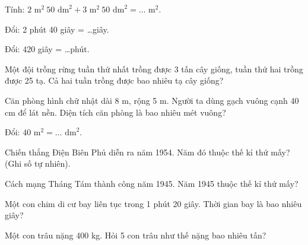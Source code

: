 \begin{ex}
Tính: $2\text{ m}^2\ 50\text{ dm}^2 + 3\text{ m}^2\ 50\text{ dm}^2 = \dots\text{ m}^2$.
\end{ex}

\begin{ex}
Đổi: 2 phút 40 giây = \dots giây.
\end{ex}

\begin{ex}
Đổi: 420 giây = \dots phút.
\end{ex}

\begin{ex}
Một đội trồng rừng tuần thứ nhất trồng được 3 tấn cây giống, tuần thứ hai trồng được 25 tạ. Cả hai tuần trồng được bao nhiêu tạ cây giống?
\end{ex}

\begin{ex}
Căn phòng hình chữ nhật dài 8 m, rộng 5 m. Người ta dùng gạch vuông cạnh 40 cm để lát nền. Diện tích căn phòng là bao nhiêu mét vuông?
\end{ex}

\begin{ex}
Đổi: $40\text{ m}^2 = \dots\text{ dm}^2$.
\end{ex}

\begin{ex}
Chiến thắng Điện Biên Phủ diễn ra năm 1954. Năm đó thuộc thế kỉ thứ mấy? (Ghi số tự nhiên).
\end{ex}

\begin{ex}
Cách mạng Tháng Tám thành công năm 1945. Năm 1945 thuộc thế kỉ thứ mấy?
\end{ex}

\begin{ex}
Một con chim di cư bay liên tục trong 1 phút 20 giây. Thời gian bay là bao nhiêu giây?
\end{ex}

\begin{ex}
Một con trâu nặng 400 kg. Hỏi 5 con trâu như thế nặng bao nhiêu tấn?
\end{ex}

